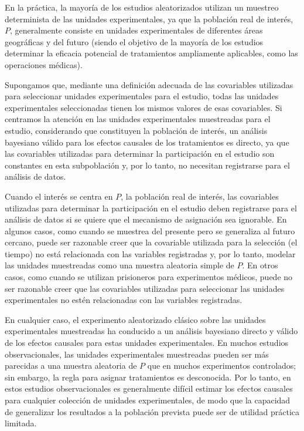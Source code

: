\documentclass[12pt,a4paper]{article}
\begin{document}
{{En la práctica, la mayoría de los estudios aleatorizados utilizan un muestreo determinista de las unidades experimentales, ya que la población real de interés, $P$, generalmente consiste en unidades experimentales de diferentes áreas geográficas y del futuro (siendo el objetivo de la mayoría de los estudios determinar la eficacia potencial de tratamientos ampliamente aplicables, como las operaciones médicas). 

Supongamos que, mediante una definición adecuada de las covariables utilizadas para seleccionar unidades experimentales para el estudio, todas las unidades experimentales seleccionadas tienen los mismos valores de esas covariables. Si centramos la atención en las unidades experimentales muestreadas para el estudio, considerando que constituyen la población de interés, un análisis bayesiano válido para los efectos causales de los tratamientos es directo, ya que las covariables utilizadas para determinar la participación en el estudio son constantes en esta subpoblación y, por lo tanto, no necesitan registrarse para el análisis de datos. 

Cuando el interés se centra en $P$, la población real de interés, las covariables utilizadas para determinar la participación en el estudio deben registrarse para el análisis de datos si se quiere que el mecanismo de asignación sea ignorable. En algunos casos, como cuando se muestrea del presente pero se generaliza al futuro cercano, puede ser razonable creer que la covariable utilizada para la selección (el tiempo) no está relacionada con las variables registradas y, por lo tanto, modelar las unidades muestreadas como una muestra aleatoria simple de $P$. En otros casos, como cuando se utilizan prisioneros para experimentos médicos, puede no ser razonable creer que las covariables utilizadas para seleccionar las unidades experimentales no estén relacionadas con las variables registradas.

En cualquier caso, el experimento aleatorizado clásico sobre las unidades experimentales muestreadas ha conducido a un análisis bayesiano directo y válido de los efectos causales para estas unidades experimentales.  En muchos estudios observacionales, las unidades experimentales muestreadas pueden ser más parecidas a una muestra aleatoria de $P$ que en muchos experimentos controlados; sin embargo, la regla para asignar tratamientos es desconocida. Por lo tanto, en estos estudios observacionales es generalmente difícil estimar los efectos causales para cualquier colección de unidades experimentales, de modo que la capacidad de generalizar los resultados a la población prevista puede ser de utilidad práctica limitada. 

}}
\end{document}
